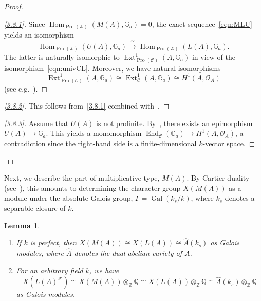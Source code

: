 \documentclass[11pt]{article}
\newtheorem{lemm}[theo]{Lemma}
\theoremstyle{definition}
\newenvironment{proofc}{\begin{proof}}{\end{proof}}
\numberwithin{equation}{section}
\newcommand\bG{{\mathbb G}}
\newcommand\bQ{{\mathbb Q}}
\newcommand\bZ{{\mathbb Z}}
\newcommand\cC{{\mathcal C}}
\newcommand\cF{{\mathcal F}}
\newcommand\cL{{\mathcal L}}
\newcommand\cO{{\mathcal O}}
\newcommand\wA{\widehat{A}}
\DeclareMathOperator{\End}{End}
\DeclareMathOperator{\Ext}{Ext}
\DeclareMathOperator{\Gal}{Gal}
\DeclareMathOperator{\Hom}{Hom}
\DeclareMathOperator{\Pro}{Pro}
\newenvironment{step}[1]{\begin{proof}[#1]}{\let\qed\relax\end{proof}}
\newenvironment{laststep}[1]{\begin{proof}[#1]}{\end{proof}}
\renewenvironment{proofc}{\begin{proof}}{\end{proof}}
\theoremstyle{remark}
\newcommand*{\romanenumi}{}%
\begin{document}
\begin{proofc}
\begin{step}{\eqref{3.8.1}}%
Since $\Hom_{\Pro(\cL)}(M(A),\bG_a) = 0$, the exact sequence~\eqref{eqn:MLU} yields an isomorphism
\[
\Hom_{\Pro(\cL)}(U(A),\bG_a)
\stackrel{\cong}{\longrightarrow}
\Hom_{\Pro(\cL)}(L(A),\bG_a).
\]
The latter is naturally isomorphic to $\Ext^1_{\Pro(\cC)}(A,\bG_a)$ in view of the isomorphism~\eqref{eqn:univCL}. Moreover, we have natural isomorphisms
\[
\Ext^1_{\Pro(\cC)}(A,\bG_a) \cong
\Ext^1_{\cC}(A,\bG_a) \cong H^1(A,\cO_A)
\]
(see e.g.~\cite[III.17]{Oort}).
\end{step}

\begin{step}{\eqref{3.8.2}}%
This follows from~\eqref{3.8.1} combined with~\cite[IV.2.4.2]{DG}.
\end{step}

\begin{laststep}{\eqref{3.8.3}}%
Assume that $U(A)$ is not profinite. By~\cite[V.3.2.5]{DG}, there exists an epimorphism $U(A) \to \bG_a$. This yields a monomorphism $\End_{\cC}(\bG_a) \to H^1(A,\cO_A)$, a contradiction since the right-hand side is a finite-dimensional $k$-vector space.
\end{laststep}
\let\qed\relax
\end{proofc}

Next, we describe the part of multiplicative type, $M(A)$. By Cartier duality (see~\cite[IV.1.3.6]{DG}), this amounts to determining the character group $X(M(A))$ as a module under the absolute Galois group, $\Gamma = \Gal(k_s/k)$, where $k_s$ denotes a separable closure of $k$.

\begin{lemm}\label{lem:T(A)}\ 
\begin{enumerate}\romanenumi
\item \label{3.9.1} If $k$ is perfect, then $X(M(A)) \cong X(L(A)) \cong \wA(k_s)$ as Galois modules, where $\wA$ denotes the dual abelian variety of $A$.
\item \label{3.9.2} For an arbitrary field $k$, we have
\[
X(L(A)^{\cF}) \cong X(M(A)) \otimes_{\bZ} \bQ
\cong X(L(A)) \otimes_{\bZ} \bQ \cong
\wA(k_s) \otimes_{\bZ} \bQ
\]
as Galois modules.
\end{enumerate}
\end{lemm}
\end{document}
